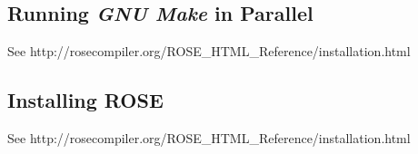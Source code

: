 \subsection{Running {\em GNU Make} in Parallel}
\label{gettingStarted:parallelMake}

See http://rosecompiler.org/ROSE\_HTML\_Reference/installation.html


\subsection{Installing ROSE}
\label{gettingStarted:installation}

See http://rosecompiler.org/ROSE\_HTML\_Reference/installation.html

